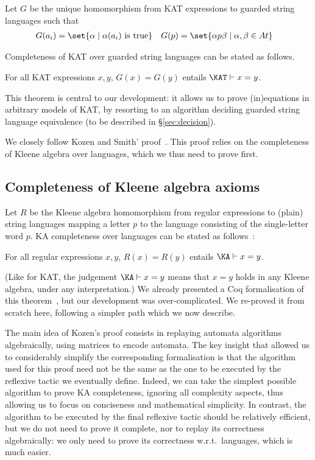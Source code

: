 \documentclass[a4paper]{llncs}
\newif\iflong\longfalse
\begin{document}
Let $G$ be the unique homomorphism from KAT expressions to guarded
string languages such that
\begin{align*}
  G(a_i) &= \set{\alpha \mid \alpha(a_i)\text{ is true}} &
  G(p) &= \set{\alpha p\beta \mid \alpha,\beta\in At}
\end{align*}
\iflong
(i.e., a primitive test is mapped to the set of atoms that declare it
to hold, and a letter $p$ is mapped to the set of all guarded string
containing a single letter, $p$).
\fi
Completeness of KAT over guarded string languages can be stated as
follows.
\begin{theorem}
  \label{thm:kat:compl}
  For all KAT expressions $x,y$, $G(x)=G(y)$ entails $\KAT\vdash x=y$.
\end{theorem}
This theorem is central to our development: it allows us to prove
(in)equations in arbitrary models of KAT, by resorting to an algorithm
deciding guarded string language equivalence (to be described in
§\ref{sec:decision}).

We closely follow Kozen and Smith'
proof~\cite{kozens96:kat:completeness:decidability}. This proof relies
on the completeness of Kleene algebra over languages, which we thus
need to prove first.

\subsection{Completeness of Kleene algebra axioms}
\label{ssec:ka:completeness}

Let $R$ be the Kleene algebra homomorphism from regular expressions to
(plain) string languages mapping a letter $p$ to the language
consisting of the single-letter word $p$. KA completeness over
languages can be stated as follows~\cite{kozen94:ka:completeness}:
\begin{theorem}
  \label{thm:ka:compl}
  For all regular expressions $x,y$, $R(x)=R(y)$ entails $\KA\vdash
  x=y$.
\end{theorem}
(Like for KAT, the judgement $\KA\vdash x=y$ means that $x=y$ holds in
any Kleene algebra, under any interpretation.) We already presented a
Coq formalisation of this theorem~\cite{bp:itp10:kacoq}, but our
development was over-complicated. We re-proved it from scratch here,
following a simpler path which we now describe.

The main idea of Kozen's proof consists in replaying automata
algorithms algebraically, using matrices to encode automata. The key
insight that allowed us to considerably simplify the corresponding
formalisation is that the algorithm used for this proof need not be
the same as the one to be executed by the reflexive tactic we
eventually define.
Indeed, we can take the simplest possible algorithm to prove KA
completeness, ignoring all complexity aspects, thus allowing us to
focus on conciseness and mathematical simplicity. 
In contrast, the algorithm to be executed by the final reflexive
tactic should be relatively efficient, but we do not need to prove it
complete, nor to replay its correctness algebraically: we only need
to prove its correctness w.r.t.\ languages, which is much
easier. 
\end{document}
